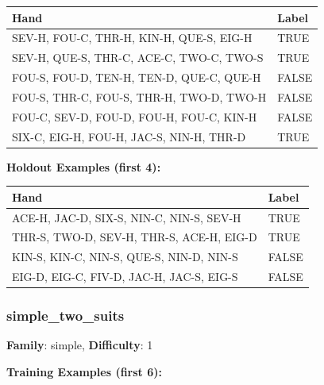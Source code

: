 \documentclass[10pt,a4paper]{article}
\begin{document}
\begin{small}
\begin{tabular}{p{8cm}l}
\toprule
Hand & Label \\
\midrule
SEV-H, FOU-C, THR-H, KIN-H, QUE-S, EIG-H & \textcolor{positive}{TRUE} \\
SEV-H, QUE-S, THR-C, ACE-C, TWO-C, TWO-S & \textcolor{positive}{TRUE} \\
FOU-S, FOU-D, TEN-H, TEN-D, QUE-C, QUE-H & \textcolor{negative}{FALSE} \\
FOU-S, THR-C, FOU-S, THR-H, TWO-D, TWO-H & \textcolor{negative}{FALSE} \\
FOU-C, SEV-D, FOU-D, FOU-H, FOU-C, KIN-H & \textcolor{negative}{FALSE} \\
SIX-C, EIG-H, FOU-H, JAC-S, NIN-H, THR-D & \textcolor{positive}{TRUE} \\
\bottomrule
\end{tabular}
\end{small}

\textbf{Holdout Examples (first 4):}

\begin{small}
\begin{tabular}{p{8cm}l}
\toprule
Hand & Label \\
\midrule
ACE-H, JAC-D, SIX-S, NIN-C, NIN-S, SEV-H & \textcolor{positive}{TRUE} \\
THR-S, TWO-D, SEV-H, THR-S, ACE-H, EIG-D & \textcolor{positive}{TRUE} \\
KIN-S, KIN-C, NIN-S, QUE-S, NIN-D, NIN-S & \textcolor{negative}{FALSE} \\
EIG-D, EIG-C, FIV-D, JAC-H, JAC-S, EIG-S & \textcolor{negative}{FALSE} \\
\bottomrule
\end{tabular}
\end{small}

\vspace{0.5cm}

\subsubsection{simple\_two\_suits}

\textbf{Family}: simple, \textbf{Difficulty}: 1

\textbf{Training Examples (first 6):}
\end{document}
